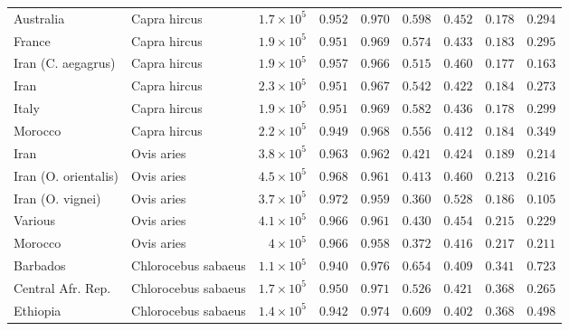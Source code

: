 \documentclass{article}
\begin{document}
\begin{center}
\begin{adjustbox}{width=\textwidth}
\begin{tabular}{||l|l|r||r|r||r|r||r|r||}
                \rowcolor{LIGHTGREY} Australia & Capra hircus & $1.7\times 10^{5}$ & $ 0.952$ & $ 0.970$ & $ 0.598$ & $ 0.452$ & $ 0.178$ & $ 0.294$ \\
                \rowcolor{LIGHTGREY} France & Capra hircus & $1.9\times 10^{5}$ & $ 0.951$ & $ 0.969$ & $ 0.574$ & $ 0.433$ & $ 0.183$ & $ 0.295$ \\
                \rowcolor{LIGHTGREY} Iran (C. aegagrus) & Capra hircus & $1.9\times 10^{5}$ & $ 0.957$ & $ 0.966$ & $ 0.515$ & $ 0.460$ & $ 0.177$ & $ 0.163$ \\
                \rowcolor{LIGHTGREY} Iran & Capra hircus & $2.3\times 10^{5}$ & $ 0.951$ & $ 0.967$ & $ 0.542$ & $ 0.422$ & $ 0.184$ & $ 0.273$ \\
                \rowcolor{LIGHTGREY} Italy & Capra hircus & $1.9\times 10^{5}$ & $ 0.951$ & $ 0.969$ & $ 0.582$ & $ 0.436$ & $ 0.178$ & $ 0.299$ \\
                \rowcolor{LIGHTGREY} Morocco & Capra hircus & $2.2\times 10^{5}$ & $ 0.949$ & $ 0.968$ & $ 0.556$ & $ 0.412$ & $ 0.184$ & $ 0.349$ \\
                Iran & Ovis aries & $3.8\times 10^{5}$ & $ 0.963$ & $ 0.962$ & $ 0.421$ & $ 0.424$ & $ 0.189$ & $ 0.214$ \\
                Iran (O. orientalis) & Ovis aries & $4.5\times 10^{5}$ & $ 0.968$ & $ 0.961$ & $ 0.413$ & $ 0.460$ & $ 0.213$ & $ 0.216$ \\
                Iran (O. vignei) & Ovis aries & $3.7\times 10^{5}$ & $ 0.972$ & $ 0.959$ & $ 0.360$ & $ 0.528$ & $ 0.186$ & $ 0.105$ \\
                Various & Ovis aries & $4.1\times 10^{5}$ & $ 0.966$ & $ 0.961$ & $ 0.430$ & $ 0.454$ & $ 0.215$ & $ 0.229$ \\
                Morocco & Ovis aries & $ 4\times 10^{5}$ & $ 0.966$ & $ 0.958$ & $ 0.372$ & $ 0.416$ & $ 0.217$ & $ 0.211$ \\
                \rowcolor{LIGHTGREY} Barbados & Chlorocebus sabaeus & $1.1\times 10^{5}$ & $ 0.940$ & $ 0.976$ & $ 0.654$ & $ 0.409$ & $ 0.341$ & $ 0.723$ \\
                \rowcolor{LIGHTGREY} Central Afr. Rep. & Chlorocebus sabaeus & $1.7\times 10^{5}$ & $ 0.950$ & $ 0.971$ & $ 0.526$ & $ 0.421$ & $ 0.368$ & $ 0.265$ \\
                \rowcolor{LIGHTGREY} Ethiopia & Chlorocebus sabaeus & $1.4\times 10^{5}$ & $ 0.942$ & $ 0.974$ & $ 0.609$ & $ 0.402$ & $ 0.368$ & $ 0.498$ \\

\end{tabular}
\end{adjustbox}
\end{center}
\end{document}
